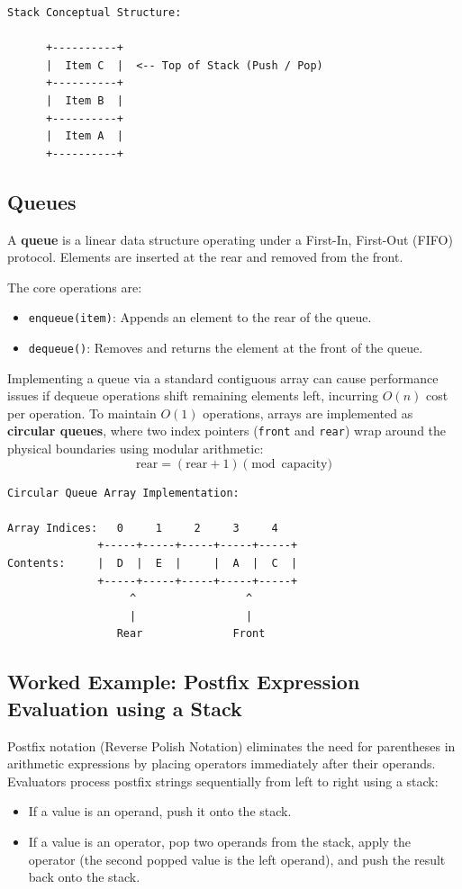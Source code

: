 \documentclass[12pt]{report}
\begin{document}
\begin{verbatim}
Stack Conceptual Structure:

      +----------+
      |  Item C  |  <-- Top of Stack (Push / Pop)
      +----------+
      |  Item B  |
      +----------+
      |  Item A  |
      +----------+
\end{verbatim}

\subsection{Queues}

A \textbf{queue} is a linear data structure operating under a First-In, First-Out (FIFO) protocol. Elements are inserted at the rear and removed from the front.

The core operations are:
\begin{itemize}
    \item \texttt{enqueue(item)}: Appends an element to the rear of the queue.
    \item \texttt{dequeue()}: Removes and returns the element at the front of the queue.
\end{itemize}

Implementing a queue via a standard contiguous array can cause performance issues if dequeue operations shift remaining elements left, incurring $O(n)$ cost per operation. To maintain $O(1)$ operations, arrays are implemented as \textbf{circular queues}, where two index pointers (\texttt{front} and \texttt{rear}) wrap around the physical boundaries using modular arithmetic:
\[
\text{rear} = (\text{rear} + 1) \pmod{\text{capacity}}
\]

\begin{verbatim}
Circular Queue Array Implementation:

Array Indices:   0     1     2     3     4
              +-----+-----+-----+-----+-----+
Contents:     |  D  |  E  |     |  A  |  C  |
              +-----+-----+-----+-----+-----+
                   ^                 ^
                   |                 |
                 Rear              Front
\end{verbatim}

\subsection{Worked Example: Postfix Expression Evaluation using a Stack}

Postfix notation (Reverse Polish Notation) eliminates the need for parentheses in arithmetic expressions by placing operators immediately after their operands. Evaluators process postfix strings sequentially from left to right using a stack:
\begin{itemize}
    \item If a value is an operand, push it onto the stack.
    \item If a value is an operator, pop two operands from the stack, apply the operator (the second popped value is the left operand), and push the result back onto the stack.
\end{itemize}
\end{document}
